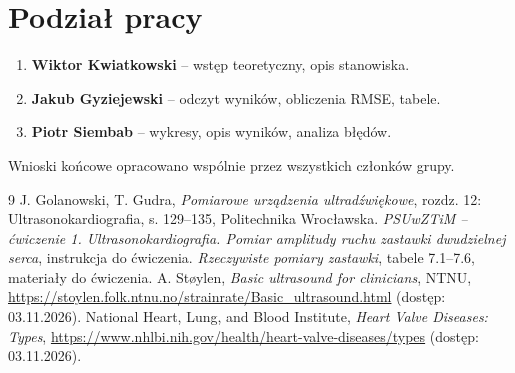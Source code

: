 \documentclass[12pt,a4paper]{article}
\begin{document}
\section{Podział pracy}

\begin{enumerate}
  \item \textbf{Wiktor Kwiatkowski} -- wstęp teoretyczny, opis stanowiska.
  \item \textbf{Jakub Gyziejewski} -- odczyt wyników, obliczenia RMSE, tabele.
  \item \textbf{Piotr Siembab} -- wykresy, opis wyników, analiza błędów.
\end{enumerate}
Wnioski końcowe opracowano wspólnie przez wszystkich członków grupy.

\newpage

\begin{thebibliography}{9}
   J. Golanowski, T. Gudra, \emph{Pomiarowe urządzenia ultradźwiękowe},
    rozdz. 12: Ultrasonokardiografia, s. 129--135, Politechnika Wrocławska.
   \emph{PSUwZTiM -- ćwiczenie 1. Ultrasonokardiografia. Pomiar
    amplitudy ruchu zastawki dwudzielnej serca}, instrukcja do ćwiczenia.
   \emph{Rzeczywiste pomiary zastawki}, tabele 7.1--7.6, materiały do
    ćwiczenia.
   A. St{\o}ylen, \emph{Basic ultrasound for clinicians}, NTNU,
    \url{https://stoylen.folk.ntnu.no/strainrate/Basic_ultrasound.html}
    (dostęp: 03.11.2026).
   National Heart, Lung, and Blood Institute, \emph{Heart Valve Diseases:
    Types}, \url{https://www.nhlbi.nih.gov/health/heart-valve-diseases/types}
    (dostęp: 03.11.2026).
\end{thebibliography}
\end{document}
